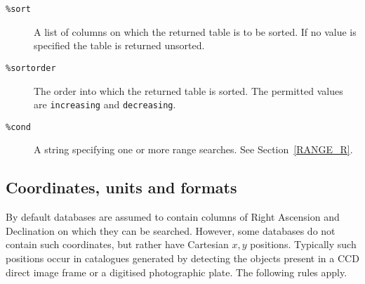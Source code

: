 \documentclass[twoside,11pt]{article}
\renewcommand{\_}{\texttt{\symbol{95}}}
\begin{document}
\begin{description}
  \item[{\tt \%sort}] A list of columns on which the returned table is
   to be sorted.  If no value is specified the table is returned unsorted.

  \item[{\tt \%sortorder}] The order into which the returned table is
   sorted.  The permitted values are {\tt increasing} and {\tt decreasing}.

  \item[{\tt \%cond}] A string specifying one or more range searches.
   See Section~\ref{RANGE_R}.

\end{description}

\subsection{\label{CUF_R}Coordinates, units and formats}

By default databases are assumed to contain columns of Right Ascension
and Declination on which they can be searched.  However, some databases
do not contain such coordinates, but rather have Cartesian $x,y$\/
positions.  Typically such positions occur in catalogues generated
by detecting the objects present in a CCD direct image frame or a
digitised photographic plate.  The following rules apply.
\end{document}

